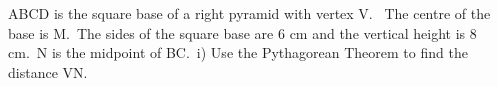 \documentclass[preview]{standalone}
\begin{document}
\begin{center}
\begin{minipage}{12cm}
\raggedright ABCD is the square base of a right pyramid with vertex V. \
 The centre of the base is M.\
 The sides of the square base are 6 cm and the vertical height is 8 cm.\
 N is the midpoint of BC.\
 i) Use the Pythagorean Theorem to find the distance VN.
\end{minipage}
\end{center}
\end{document}
